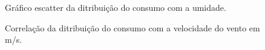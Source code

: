 \documentclass[	12pt, Times, openright, twoside, a4paper, english, brazil]{abntex2}
\begin{document}
                \begin{figure}[!ht]
                	\caption{Gráfico escatter da ditribuição do consumo com a umidade. \label{fig:case1_temperatura_scatter} }
                \end{figure}
                 \begin{figure}[!ht]
                    	\caption{Correlação da ditribuição do consumo com a velocidade do vento em m/s. \label{fig:case1_vento} }
                    \end{figure}
                
\end{document}
